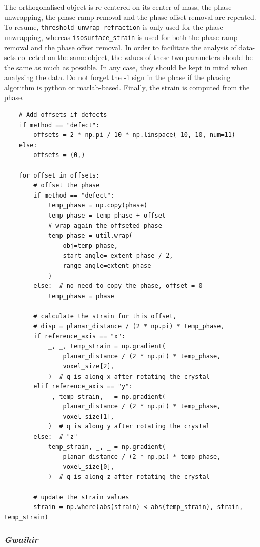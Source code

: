 The orthogonalised object is re-centered on its center of mass, the phase unwrapping, the phase ramp removal and the phase offset removal are repeated. To resume, \verb|threshold_unwrap_refraction| is only used for the phase unwrapping, whereas  \verb|isosurface_strain| is used for both the phase ramp removal and the phase offset removal.
In order to facilitate the analysis of data-sets collected on the same object, the values of these two parameters should be the same as much as possible. In any case, they should be kept in mind when analysing the data.
Do not forget the -1 sign in the phase if the phasing algorithm is python or matlab-based.
Finally, the strain is computed from the phase.

\begin{verbatim}
    # Add offsets if defects
    if method == "defect":
        offsets = 2 * np.pi / 10 * np.linspace(-10, 10, num=11)
    else:
        offsets = (0,)
        
    for offset in offsets:
        # offset the phase
        if method == "defect":
            temp_phase = np.copy(phase)
            temp_phase = temp_phase + offset
            # wrap again the offseted phase
            temp_phase = util.wrap(
                obj=temp_phase,
                start_angle=-extent_phase / 2,
                range_angle=extent_phase
            )
        else:  # no need to copy the phase, offset = 0
            temp_phase = phase

        # calculate the strain for this offset,
        # disp = planar_distance / (2 * np.pi) * temp_phase,
        if reference_axis == "x":
            _, _, temp_strain = np.gradient(
                planar_distance / (2 * np.pi) * temp_phase,
                voxel_size[2],
            )  # q is along x after rotating the crystal
        elif reference_axis == "y":
            _, temp_strain, _ = np.gradient(
                planar_distance / (2 * np.pi) * temp_phase,
                voxel_size[1],
            )  # q is along y after rotating the crystal
        else:  # "z"
            temp_strain, _, _ = np.gradient(
                planar_distance / (2 * np.pi) * temp_phase,
                voxel_size[0],
            )  # q is along z after rotating the crystal

        # update the strain values
        strain = np.where(abs(strain) < abs(temp_strain), strain, temp_strain)
\end{verbatim}


\subsubsection{\textit{Gwaihir}}